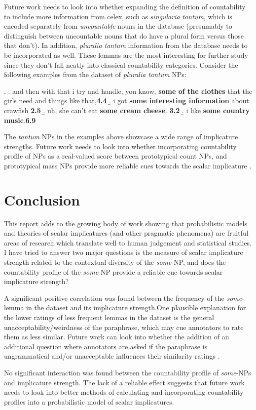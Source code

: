 \documentclass[10pt, biblatex]{report}
\begin{document}
Future work needs to look into whether expanding the definition of countability
to include more information from {\rmsc celex}, such as \textit{singularia
tantum}, which is encoded separately from \textit{uncountable} nouns in the
database (presumably to distinguish between uncountable nouns that do have a
plural form versus those that don't). In addition, \textit{pluralia tantum}
information from the database needs to be incorporated as well. These lemmas
are the most interesting for further study since they don't fall neatly into
classical countability categories. Consider the
following examples from the dataset of \textit{pluralia tantum} NPs:

\ex. \a. and then with that i try and handle, you know, \textbf{some of the
         clothes} that the girls need and things like that,\hfill \textbf{4.4}
     \b. i got \textbf{some interesting information} about crawfish \hfill \textbf{2.5}
     \b. uh, she can't eat \textbf{some cream cheese}. \hfill \textbf{3.2}
     \b. i like \textbf{some country music}.\hfill \textbf{6.9}

The \textit{tantum} NPs in the examples above showcase a wide range of implicature
strengths. Future work needs to look into whether incorporating countability
profile of NPs as a real-valued score between prototypical count NPs, and
prototypical mass NPs provide more reliable cues towards the scalar implicature
\citep{grimmgrammatical2018}.

\section{Conclusion}
\label{sec:conclusion}

This report adds to the growing body of work showing that probabilistic models
and theories of scalar implicatures (and other pragmatic phenomena) are fruitful
areas of research which translate well to human judgement and statistical
studies. I have tried to answer two major questions \dash is the measure
of scalar implicature strength related to the contextual diversity of the
\textit{some}-NP, and does the countability profile of the \textit{some}-NP
provide a reliable cue towards scalar implicature strength?

A significant positive correlation was found between the frequency of the
\textit{some}-lemma in the dataset and its implicature strength.One plausible
explanation for the lower ratings of less frequent lemmas in the
dataset is the general unacceptability/weirdness of the paraphrase, which may
cue annotators to rate them as less similar. Future work can look into whether
the addition of an additional question where annotators are asked if the
paraphrase is ungrammatical and/or unacceptable influences their similarity
ratings \citep{white_computational_2016}.

No significant interaction was found between the countability profile of
\textit{some}-NPs and implicature strength. The lack of a reliable effect
suggests that future work needs to look into better
methods of calculating and incorporating countability profiles into a
probabilistic model of scalar implicatures.


\newpage
\printbibliography[title={references}]
\end{document}
